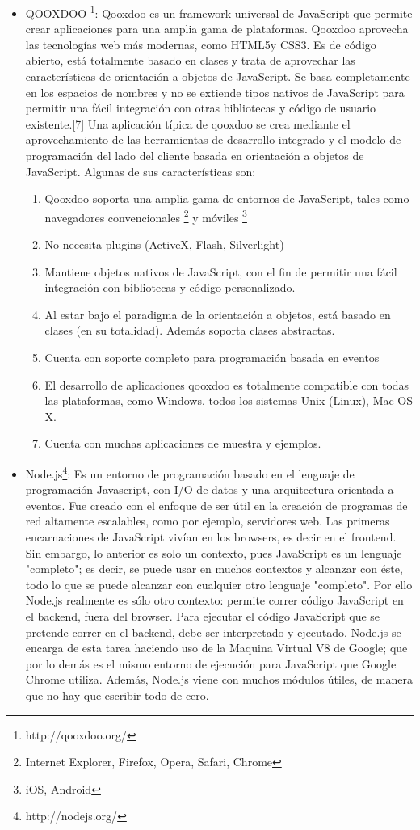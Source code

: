 \begin{itemize}
 \item QOOXDOO \footnote{http://qooxdoo.org/}: Qooxdoo es un framework universal de JavaScript que permite crear aplicaciones para 
  una amplia gama de plataformas. Qooxdoo aprovecha las tecnologías web más modernas, como HTML5y CSS3. Es de código abierto,
  está totalmente basado en clases y trata de aprovechar las características de orientación a objetos de JavaScript. 
  Se basa completamente en los espacios de nombres y no se extiende tipos nativos de JavaScript para permitir una fácil integración 
  con otras bibliotecas y código de usuario existente.[7]
  Una aplicación típica de qooxdoo se crea mediante el aprovechamiento de las herramientas de desarrollo integrado y el modelo de 
  programación del lado del cliente basada en orientación a objetos de JavaScript.
  Algunas de sus características son:
   \begin{enumerate}
    \item Qooxdoo soporta una amplia gama de entornos de JavaScript, tales como navegadores convencionales
      \footnote{Internet Explorer, Firefox, Opera, Safari, Chrome} y móviles \footnote{iOS, Android}
    \item No necesita plugins (ActiveX, Flash, Silverlight)
    \item Mantiene objetos nativos de JavaScript, con el fin de permitir una fácil integración con bibliotecas y código personalizado. 
    \item Al estar bajo el paradigma de la orientación a objetos, está basado en clases (en su totalidad). Además soporta
      clases abstractas.
    \item Cuenta con soporte completo para programación basada en eventos
    \item El desarrollo de aplicaciones qooxdoo es totalmente compatible con todas las plataformas, como Windows, todos los 
      sistemas Unix (Linux), Mac OS X.
    \item Cuenta con muchas aplicaciones de muestra y ejemplos.
   \end{enumerate}
  \item Node.js\footnote{http://nodejs.org/}: Es un entorno de programación basado en el lenguaje de programación 
  Javascript, con I/O de datos y una arquitectura orientada a eventos. Fue creado con el enfoque de ser
  útil en la creación de programas de red altamente escalables, como por ejemplo, servidores web.
  Las primeras encarnaciones de JavaScript vivían en los browsers, es decir en el frontend. Sin embargo, lo anterior es solo un contexto,
  pues JavaScript es un lenguaje "completo"; es decir, se puede  usar en muchos contextos y alcanzar con éste, todo lo que se puede
  alcanzar con cualquier otro lenguaje "completo".
  Por ello Node.js realmente es sólo otro contexto: permite correr código JavaScript en el backend, fuera del browser.
  Para ejecutar el código JavaScript que se pretende correr en el backend, debe ser interpretado y ejecutado. Node.js se encarga
  de esta tarea haciendo uso de la Maquina Virtual V8 de Google; que por lo demás es el mismo entorno de ejecución para JavaScript 
  que Google Chrome utiliza.
  Además, Node.js viene con muchos módulos útiles, de manera que no hay que escribir todo de cero.
 


\end{itemize}
